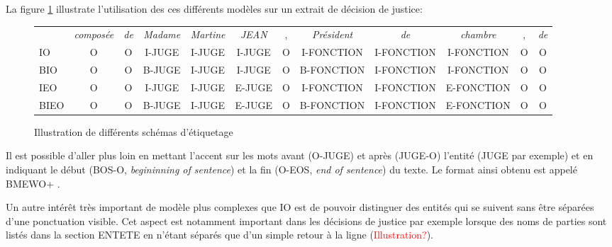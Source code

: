 La figure \ref{p4_sample-tagmod} illustrate l'utilisation des ces différents modèles sur un extrait de décision de justice:
\begin{figure}[!h]
\tiny
\begin{tabular}{l|ccccccccccc}
 & \textit{composée} & \textit{de} & \textit{Madame} & \textit{Martine} & \textit{JEAN} & , & \textit{Président} & \textit{de} & \textit{chambre} & , & \textit{de} \\ 
IO & O & O & I-JUGE & I-JUGE & I-JUGE & O & I-FONCTION & I-FONCTION & I-FONCTION & O & O \\
BIO & O & O & B-JUGE & I-JUGE & I-JUGE & O & B-FONCTION & I-FONCTION & I-FONCTION & O & O \\
IEO & O & O & I-JUGE & I-JUGE & E-JUGE & O & I-FONCTION & I-FONCTION & E-FONCTION & O & O \\
BIEO & O & O & B-JUGE & I-JUGE & E-JUGE & O & B-FONCTION & I-FONCTION & E-FONCTION & O & O \\
\end{tabular}
\caption{Illustration de différents schémas d'étiquetage}\label{p4_sample-tagmod}
\end{figure}

Il est possible d'aller plus loin en mettant l'accent sur les mots avant  (O-JUGE) et après (JUGE-O) l'entité (JUGE par exemple) et en indiquant le début (BOS-O, \textit{begininning of sentence}) et la fin (O-EOS, \textit{end of sentence}) du texte. Le format ainsi obtenu est appelé BMEWO+ \citep{baldwin2009bmewo}.

Un autre intérêt très important de modèle plus complexes que IO est de pouvoir distinguer des entités qui se suivent sans être séparées d'une ponctuation visible. Cet aspect est notamment important dans les décisions de justice par exemple lorsque des noms de parties sont listés dans la section ENTETE en n'étant séparés que d'un simple retour à la ligne (\textcolor{red}{Illustration?}).


